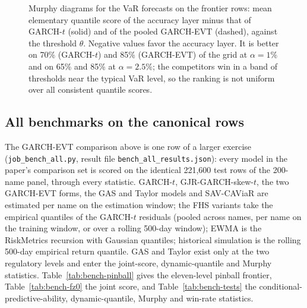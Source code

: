 \documentclass[11pt]{article}
\begin{document}
\begin{figure}[htbp]
\caption{Murphy diagrams for the VaR forecasts on the frontier rows: mean elementary quantile score of the accuracy layer minus that of GARCH-$t$ (solid) and of the pooled GARCH-EVT (dashed), against the threshold $\theta$. Negative values favor the accuracy layer. It is better on 70\% (GARCH-$t$) and 85\% (GARCH-EVT) of the grid at $\alpha=1\%$ and on 65\% and 85\% at $\alpha=2.5\%$; the competitors win in a band of thresholds near the typical VaR level, so the ranking is not uniform over all consistent quantile scores.}
\label{fig:murphy}
\end{figure}

\subsection*{All benchmarks on the canonical rows}
The GARCH-EVT comparison above is one row of a larger exercise (\texttt{job\_bench\_all.py}, result file \texttt{bench\_all\_results.json}): every model in the paper's comparison set is scored on the identical 221,600 test rows of the 200-name panel, through every statistic. GARCH-$t$, GJR-GARCH-skew-$t$, the two GARCH-EVT forms, the GAS and Taylor models and SAV-CAViaR are estimated per name on the estimation window; the FHS variants take the empirical quantiles of the GARCH-$t$ residuals (pooled across names, per name on the training window, or over a rolling 500-day window); EWMA is the RiskMetrics recursion with Gaussian quantiles; historical simulation is the rolling 500-day empirical return quantile. GAS and Taylor exist only at the two regulatory levels and enter the joint-score, dynamic-quantile and Murphy statistics. Table~\ref{tab:bench-pinball} gives the eleven-level pinball frontier, Table~\ref{tab:bench-fz0} the joint score, and Table~\ref{tab:bench-tests} the conditional-predictive-ability, dynamic-quantile, Murphy and win-rate statistics.
\end{document}
